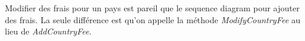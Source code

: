 Modifier des frais pour un pays est pareil que le sequence diagram pour ajouter des frais. 
La seule différence est qu'on appelle la méthode \emph{ModifyCountryFee} au lieu de \emph{AddCountryFee}.